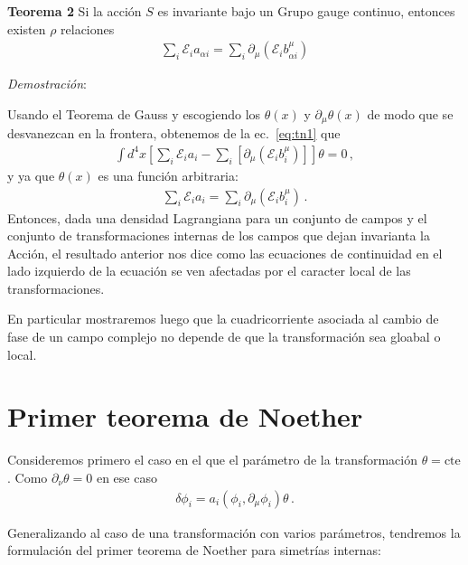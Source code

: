 \begin{frame}
\textbf{Teorema 2} Si la acción $S$ es invariante bajo un Grupo gauge continuo, entonces existen $\rho$ relaciones
\begin{align}
  \sum_{i}\mathcal{E}_{i} a_{\alpha i}=\sum_{i} \partial_{\mu} \left( \mathcal{E}_{i} b^{\mu}_{\alpha i} \right)
\end{align}
\end{frame}
\emph{Demostración}:

Usando el Teorema de Gauss y escogiendo los $\theta(x)$ y $\partial_{\mu}\theta(x)$ de modo que se desvanezcan en la frontera, obtenemos de la ec.~\eqref{eq:tn1} que
\begin{align*}
\int {d^4}x \left[    \sum_i  \mathcal{E}_ia_i -\sum_i  \left[ \partial_{\mu}   \left(  \mathcal{E}_i b^{\mu}_i  \right) \right] \right]\theta   =0\,,
\end{align*}
y ya que $\theta(x)$ es una función arbitraria:
\begin{align}
  \sum_i \mathcal{E}_ia_i=\sum_i  \partial_{\mu}   \left(  \mathcal{E}_i b^{\mu}_i  \right) \,.
\end{align}
Entonces, dada una densidad Lagrangiana para un conjunto de campos y el conjunto de transformaciones internas de los campos que dejan invarianta la Acción, el resultado anterior nos dice como las ecuaciones de continuidad en el lado izquierdo de la ecuación se ven afectadas por el caracter local de las transformaciones.

En particular mostraremos luego  que la cuadricorriente asociada al cambio de fase de un campo complejo no depende de que la transformación sea gloabal o local.




\section{Primer teorema de Noether}

Consideremos primero el caso en el que el parámetro de la transformación $\theta=\text{cte}$. Como $\partial_{\nu}\theta=0$ en ese caso
\begin{align}
\label{eq:infdt}
 \delta\phi_i= a_{i}\left( \phi_{i},\partial_{\mu}\phi_{i} \right) \theta\,.
\end{align}




Generalizando al caso de una transformación con varios parámetros, tendremos la formulación del primer teorema de Noether para simetrías internas:


